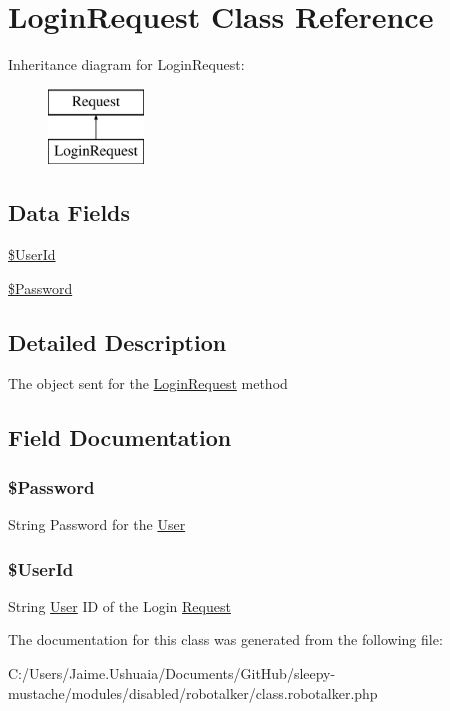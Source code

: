 \hypertarget{class_login_request}{\section{Login\-Request Class Reference}
\label{class_login_request}
}
Inheritance diagram for Login\-Request\-:\begin{figure}[H]
\begin{center}
\leavevmode
\includegraphics[height=2.000000cm]{class_login_request}
\end{center}
\end{figure}
\subsection*{Data Fields}
\begin{DoxyCompactItemize}
\item 
\hyperlink{class_login_request_a5e6181896c4104715348824d02a3075d}{\$\-User\-Id}
\item 
\hyperlink{class_login_request_ae3ac8512c0fd8924c7112671ead08cf7}{\$\-Password}
\end{DoxyCompactItemize}


\subsection{Detailed Description}
The object sent for the \hyperlink{class_login_request}{Login\-Request} method 

\subsection{Field Documentation}
\hypertarget{class_login_request_ae3ac8512c0fd8924c7112671ead08cf7}{
\subsubsection[{\$\-Password}]{\setlength{\rightskip}{0pt plus 5cm}\$Password}}\label{class_login_request_ae3ac8512c0fd8924c7112671ead08cf7}
String Password for the \hyperlink{class_user}{User} \hypertarget{class_login_request_a5e6181896c4104715348824d02a3075d}{
\subsubsection[{\$\-User\-Id}]{\setlength{\rightskip}{0pt plus 5cm}\$User\-Id}}\label{class_login_request_a5e6181896c4104715348824d02a3075d}
String \hyperlink{class_user}{User} I\-D of the Login \hyperlink{class_request}{Request} 

The documentation for this class was generated from the following file\-:\begin{DoxyCompactItemize}
\item 
C\-:/\-Users/\-Jaime.\-Ushuaia/\-Documents/\-Git\-Hub/sleepy-\/mustache/modules/disabled/robotalker/class.\-robotalker.\-php\end{DoxyCompactItemize}
